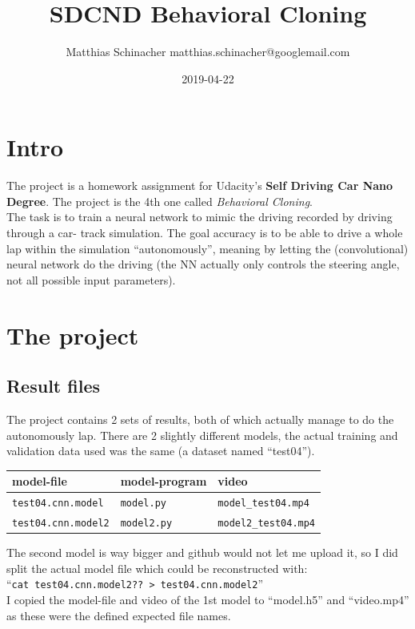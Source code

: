 \documentclass[a4paper]{article}
\title{SDCND Behavioral Cloning}
\date{2019-04-22}
\author{Matthias Schinacher matthias.schinacher@googlemail.com}
\begin{document}
\maketitle
\tableofcontents
\newpage

\section{Intro}
The project is a homework assignment for Udacity's \textbf{Self Driving Car Nano Degree}.
The project is the 4th one called \textit{Behavioral Cloning}.
\\
The task is to train a neural network to mimic the driving recorded
by driving through a car- track simulation.
The goal accuracy is to be able to drive a whole lap within the simulation
\enquote{autonomously}, meaning by letting the (convolutional) neural network
do the driving (the NN actually only controls the steering angle, not all possible
input parameters).

\section{The project}
\subsection{Result files}
The project contains 2 sets of results, both of which actually manage to
do the autonomously lap. There are 2 slightly different models, the actual
training and validation data used was the same (a dataset named \enquote{test04}).

\begin{tabular}{ |l|l|l| }
  \hline
  model-file & model-program & video \\
  \hline
  \texttt{test04.cnn.model} & \texttt{model.py} & \texttt{model\_test04.mp4} \\
  \texttt{test04.cnn.model2} & \texttt{model2.py} & \texttt{model2\_test04.mp4} \\
  \hline
\end{tabular}

The second model is way bigger and github would not let me upload it, so I did split
the actual model file which could be reconstructed with:\\
\enquote{\texttt{cat test04.cnn.model2?? > test04.cnn.model2}}
\\
I copied the model-file and video of the 1st model to \enquote{model.h5} and
\enquote{video.mp4} as these were the defined expected file names.
\end{document}

